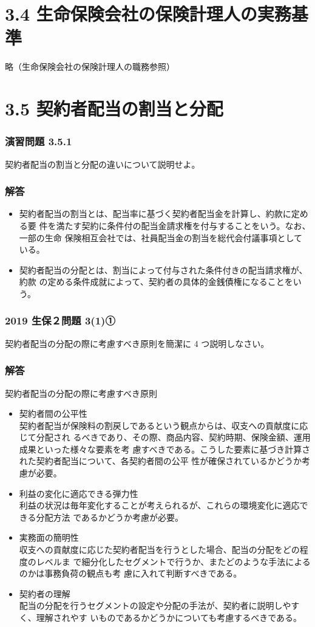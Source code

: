 \documentclass[report,gutter=10mm,fore-edge=10mm,uplatex,dvipdfmx]{jlreq}
\begin{document}
\section{3.4 生命保険会社の保険計理人の実務基準}
略（生命保険会社の保険計理人の職務参照）

\section{3.5 契約者配当の割当と分配}
\subsubsection{演習問題 3.5.1}
契約者配当の割当と分配の違いについて説明せよ。
\subsubsection{解答}

\begin{itemize}
 \item 契約者配当の割当とは、配当率に基づく契約者配当金を計算し、約款に定める要
件を満たす契約に条件付の配当金請求権を付与することをいう。なお、一部の生命
保険相互会社では、社員配当金の割当を総代会付議事項としている。
 \item 契約者配当の分配とは、割当によって付与された条件付きの配当請求権が、約款
の定める条件成就によって、契約者の具体的金銭債権になることをいう。
\end{itemize}

\subsubsection{2019 生保２問題 3(1)①}
契約者配当の分配の際に考慮すべき原則を簡潔に 4 つ説明しなさい。
\subsubsection{解答}
契約者配当の分配の際に考慮すべき原則
\begin{itemize}
 \item 
契約者間の公平性\\
契約者配当が保険料の割戻しであるという観点からは、収支への貢献度に応じて分配され
るべきであり、その際、商品内容、契約時期、保険金額、運用成果といった様々な要素を考
慮すべきである。こうした要素に基づき計算された契約者配当について、各契約者間の公平
性が確保されているかどうか考慮が必要。
 \item 
利益の変化に適応できる弾力性\\
利益の状況は毎年変化することが考えられるが、これらの環境変化に適応できる分配方法
であるかどうか考慮が必要。
 \item 
実務面の簡明性\\
収支への貢献度に応じた契約者配当を行うとした場合、配当の分配をどの程度のレベルま
で細分化したセグメントで行うか、またどのような手法によるのかは事務負荷の観点も考
慮に入れて判断すべきである。
 \item 
契約者の理解\\
配当の分配を行うセグメントの設定や分配の手法が、契約者に説明しやすく、理解されやす
いものであるかどうかについても考慮するべきである。
\end{itemize}
\end{document}

